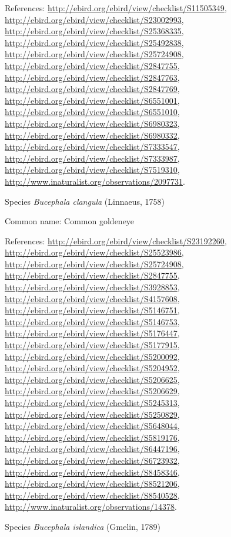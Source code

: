 \documentclass[9pt, article]{memoir}
\begin{document}
\begin{multicols}{2}
References: 
\url{http://ebird.org/ebird/view/checklist/S11505349}, 
\url{http://ebird.org/ebird/view/checklist/S23002993}, 
\url{http://ebird.org/ebird/view/checklist/S25368335}, 
\url{http://ebird.org/ebird/view/checklist/S25492838}, 
\url{http://ebird.org/ebird/view/checklist/S25724908}, 
\url{http://ebird.org/ebird/view/checklist/S2847755}, 
\url{http://ebird.org/ebird/view/checklist/S2847763}, 
\url{http://ebird.org/ebird/view/checklist/S2847769}, 
\url{http://ebird.org/ebird/view/checklist/S6551001}, 
\url{http://ebird.org/ebird/view/checklist/S6551010}, 
\url{http://ebird.org/ebird/view/checklist/S6980323}, 
\url{http://ebird.org/ebird/view/checklist/S6980332}, 
\url{http://ebird.org/ebird/view/checklist/S7333547}, 
\url{http://ebird.org/ebird/view/checklist/S7333987}, 
\url{http://ebird.org/ebird/view/checklist/S7519310}, 
\url{http://www.inaturalist.org/observations/2097731}.

\vspace{6pt}\noindent\hspace{36pt}Species \textit{Bucephala clangula} (Linnaeus, 1758)


Common name: Common goldeneye

References: 
\url{http://ebird.org/ebird/view/checklist/S23192260}, 
\url{http://ebird.org/ebird/view/checklist/S25523986}, 
\url{http://ebird.org/ebird/view/checklist/S25724908}, 
\url{http://ebird.org/ebird/view/checklist/S2847755}, 
\url{http://ebird.org/ebird/view/checklist/S3928853}, 
\url{http://ebird.org/ebird/view/checklist/S4157608}, 
\url{http://ebird.org/ebird/view/checklist/S5146751}, 
\url{http://ebird.org/ebird/view/checklist/S5146753}, 
\url{http://ebird.org/ebird/view/checklist/S5176447}, 
\url{http://ebird.org/ebird/view/checklist/S5177915}, 
\url{http://ebird.org/ebird/view/checklist/S5200092}, 
\url{http://ebird.org/ebird/view/checklist/S5204952}, 
\url{http://ebird.org/ebird/view/checklist/S5206625}, 
\url{http://ebird.org/ebird/view/checklist/S5206629}, 
\url{http://ebird.org/ebird/view/checklist/S5245313}, 
\url{http://ebird.org/ebird/view/checklist/S5250829}, 
\url{http://ebird.org/ebird/view/checklist/S5648044}, 
\url{http://ebird.org/ebird/view/checklist/S5819176}, 
\url{http://ebird.org/ebird/view/checklist/S6447196}, 
\url{http://ebird.org/ebird/view/checklist/S6723932}, 
\url{http://ebird.org/ebird/view/checklist/S8458346}, 
\url{http://ebird.org/ebird/view/checklist/S8521206}, 
\url{http://ebird.org/ebird/view/checklist/S8540528}, 
\url{http://www.inaturalist.org/observations/14378}.

\vspace{6pt}\noindent\hspace{36pt}Species \textit{Bucephala islandica} (Gmelin, 1789)



\end{multicols}
\end{document}
